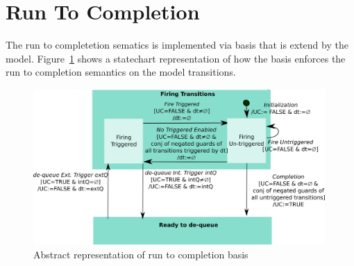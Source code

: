 

\section{Run To Completion}

The run to completetion sematics is implemented via basis that is extend by the model. Figure~\ref{fig:basis}
shows a statechart representation of how the basis enforces the run to completion semantics 
on the model transitions.
\begin{figure}[!h]
	\vspace{-.4cm}
	\centering
	\includegraphics[width=0.99\textwidth]{figures/basis.png}
	\caption{Abstract representation of run to completion basis}
	\label{fig:basis}
	\vspace{-.4cm}
\end{figure}

